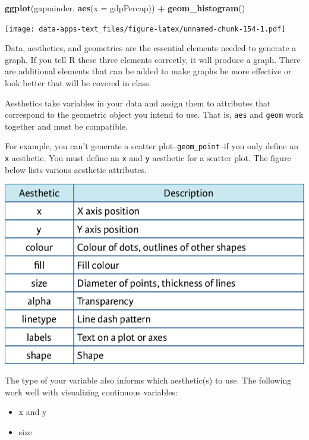 \documentclass[
]{book}
\newenvironment{Shaded}{\begin{snugshade}}{\end{snugshade}}
\newcommand{\DataTypeTok}[1]{\textcolor[rgb]{0.13,0.29,0.53}{#1}}
\newcommand{\KeywordTok}[1]{\textcolor[rgb]{0.13,0.29,0.53}{\textbf{#1}}}
\newcommand{\NormalTok}[1]{#1}
\newcommand{\OperatorTok}[1]{\textcolor[rgb]{0.81,0.36,0.00}{\textbf{#1}}}
\newcommand{\StringTok}[1]{\textcolor[rgb]{0.31,0.60,0.02}{#1}}
\providecommand{\tightlist}{%
  \setlength{\itemsep}{0pt}\setlength{\parskip}{0pt}}
\begin{document}
\begin{Shaded}
\begin{Highlighting}[]
\KeywordTok{ggplot}\NormalTok{(gapminder, }\KeywordTok{aes}\NormalTok{(}\DataTypeTok{x =}\NormalTok{ gdpPercap)) }\OperatorTok{+}
\StringTok{  }\KeywordTok{geom_histogram}\NormalTok{()}
\end{Highlighting}
\end{Shaded}

\texttt{[image: data-apps-text\_files/figure-latex/unnamed-chunk-154-1.pdf]}

Data, aesthetics, and geometries are the essential elements needed to generate a graph. If you tell R these three elements correctly, it will produce a graph. There are additional elements that can be added to make graphs be more effective or look better that will be covered in class.

Aesthetics take variables in your data and assign them to attributes that correspond to the geometric object you intend to use. That is, \texttt{aes} and \texttt{geom} work together and must be compatible.

For example, you can't generate a scatter plot--\texttt{geom\_point}--if you only define an \texttt{x} aesthetic. You must define an \texttt{x} and \texttt{y} aesthetic for a scatter plot. The figure below lists various aesthetic attributes.

\includegraphics[width=10.24in]{images/ggaes}

The type of your variable also informs which aesthetic(s) to use. The following work well with visualizing continuous variables:

\begin{itemize}
\tightlist
\item
  x and y
\item
  size
\end{itemize}
\end{document}
